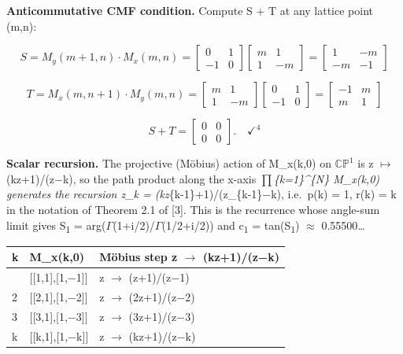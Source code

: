 \documentclass[11pt]{article}
\begin{document}
\textbf{Anticommutative CMF condition.} Compute S + T at any lattice
point (m,n):

\[S = M_y(m+1,n)\cdot M_x(m,n) = \begin{bmatrix}0&1\\-1&0\end{bmatrix}\begin{bmatrix}m&1\\1&-m\end{bmatrix} = \begin{bmatrix}1&-m\\-m&-1\end{bmatrix}\]

\[T = M_x(m,n+1)\cdot M_y(m,n) = \begin{bmatrix}m&1\\1&-m\end{bmatrix}\begin{bmatrix}0&1\\-1&0\end{bmatrix} = \begin{bmatrix}-1&m\\m&1\end{bmatrix}\]

\[S + T = \begin{bmatrix}0&0\\0&0\end{bmatrix}. \quad \checkmark^4\]

\textbf{Scalar recursion.} The projective (Möbius) action of M\_x(k,0)
on \(\mathbb{C}\mathbb{P}^{1}\) is z \(\mapsto\) (kz+1)/(z−k), so the
path product along the x-axis \(\prod\)\emph{\{k=1\}\^{}\{N\} M\_x(k,0)
generates the recursion z\_k = (kz}\{k-1\}+1)/(z\_\{k-1\}−k), i.e.~p(k)
= 1, r(k) = k in the notation of Theorem 2.1 of {[}3{]}. This is the
recurrence whose angle-sum limit gives S\textsubscript{1} =
arg(\(\Gamma\)(1+i/2)/\(\Gamma\)(1/2+i/2)) and c\textsubscript{1} =
\textbar tan(S\textsubscript{1})\textbar{} \(\approx\) 0.55500\ldots{}

\begin{longtable}[]{@{}lll@{}}
\toprule\noalign{}
k & M\_x(k,0) & Möbius step z \(\to\) (kz+1)/(z−k) \\
\midrule\noalign{}
\endhead
\bottomrule\noalign{}
\endlastfoot
1 & {[}{[}1,1{]},{[}1,−1{]}{]} & z \(\to\) (z+1)/(z−1) \\
2 & {[}{[}2,1{]},{[}1,−2{]}{]} & z \(\to\) (2z+1)/(z−2) \\
3 & {[}{[}3,1{]},{[}1,−3{]}{]} & z \(\to\) (3z+1)/(z−3) \\
k & {[}{[}k,1{]},{[}1,−k{]}{]} & z \(\to\) (kz+1)/(z−k) \\
\end{longtable}
\end{document}
